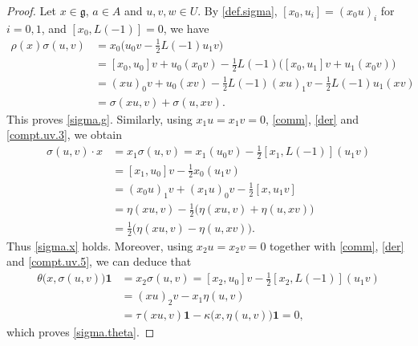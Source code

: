\documentclass[12pt]{article}
\numberwithin{equation}{section}
\theoremstyle{definition}
\theoremstyle{plain}
\newcommand{\fg}{\mathfrak{g}}
\newcommand{\bone}{\mathbf{1 }}
\begin{document}
\begin{proof}
Let $x\in\fg$, $a\in A$ and $u,v,w\in U$. By \eqref{def.sigma}, $[x_0,u_i]=(x_0u)_i$ for $i=0,1$, and $[x_0,L(-1)]=0$, we have
\begin{align*}
    \rho(x)\sigma(u,v)&=x_0\big(u_0v-\frac12L(-1)u_1v\big)\\
    &=[x_0,u_0]v+u_0(x_0v)-\frac{1}{2}L(-1)\big([x_0,u_1]v+u_1(x_0v)\big)\\
    &=(xu)_0v+u_0(xv)-\frac{1}{2}L(-1)(xu)_1v-\frac{1}{2}L(-1)u_1(xv)\\
    &=\sigma(xu,v)+\sigma(u,xv).
\end{align*}
This proves \eqref{sigma.g}. Similarly, using $x_1u=x_1v=0$, \eqref{comm}, \eqref{der} and \eqref{compt.uv.3}, we obtain
\begin{align*}
    \sigma(u,v)\cdot x&=x_1\sigma(u,v)=x_1(u_0v)-\frac12[x_1,L(-1)](u_1v)\\
    &=[x_1,u_0]v-\frac{1}{2}x_0(u_1v)\\
    &=(x_0u)_1v+(x_1u)_0v-\frac{1}{2}[x,u_1v]\\
    &=\eta(xu,v)-\frac{1}{2}\big(\eta(xu,v)+\eta(u,xv)\big)\\
    &=\frac12\big(\eta(xu,v)-\eta(u,xv)\big).
\end{align*}
Thus \eqref{sigma.x} holds. Moreover, using $x_2u=x_2v=0$ together with \eqref{comm}, \eqref{der} and \eqref{compt.uv.5}, we can deduce that
\begin{align*}
    \theta\big(x,\sigma(u,v)\big)\bone&=x_2\sigma(u,v)=[x_2,u_0]v-\frac{1}{2}[x_2,L(-1)](u_1v)\\
    &=(xu)_2v-x_1\eta(u,v)\\
    &=\tau(xu,v)\bone-\kappa\big(x,\eta(u,v)\big)\bone=0,
\end{align*}
which proves \eqref{sigma.theta}.


\end{proof}
\end{document}
